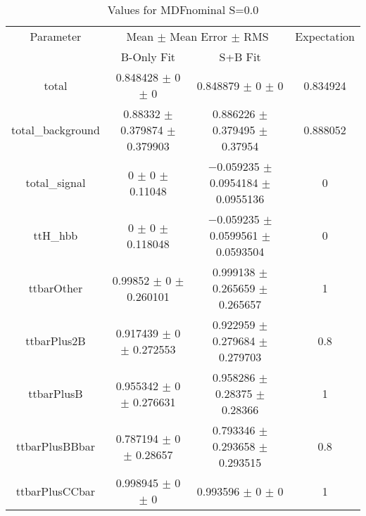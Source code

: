 \begin{table}
\centering
\caption{Values for MDFnominal S=0.0}
\begin{tabular}{cccc}
\toprule
Parameter & \multicolumn{2}{c}{Mean $\pm$ Mean Error $\pm$ RMS} & Expectation\\
 & B-Only Fit & S+B Fit & \\
\midrule
total & \num{0.848428} $\pm$ \num{0} $\pm$ \num{0} & \num{0.848879} $\pm$ \num{0} $\pm$ \num{0} & \num{0.834924}\\
total\_background & \num{0.88332} $\pm$ \num{0.379874} $\pm$ \num{0.379903} & \num{0.886226} $\pm$ \num{0.379495} $\pm$ \num{0.37954} & \num{0.888052}\\
total\_signal & \num{0} $\pm$ \num{0} $\pm$ \num{0.11048} & \num{-0.059235} $\pm$ \num{0.0954184} $\pm$ \num{0.0955136} & \num{0}\\
ttH\_hbb & \num{0} $\pm$ \num{0} $\pm$ \num{0.118048} & \num{-0.059235} $\pm$ \num{0.0599561} $\pm$ \num{0.0593504} & \num{0}\\
ttbarOther & \num{0.99852} $\pm$ \num{0} $\pm$ \num{0.260101} & \num{0.999138} $\pm$ \num{0.265659} $\pm$ \num{0.265657} & \num{1}\\
ttbarPlus2B & \num{0.917439} $\pm$ \num{0} $\pm$ \num{0.272553} & \num{0.922959} $\pm$ \num{0.279684} $\pm$ \num{0.279703} & \num{0.8}\\
ttbarPlusB & \num{0.955342} $\pm$ \num{0} $\pm$ \num{0.276631} & \num{0.958286} $\pm$ \num{0.28375} $\pm$ \num{0.28366} & \num{1}\\
ttbarPlusBBbar & \num{0.787194} $\pm$ \num{0} $\pm$ \num{0.28657} & \num{0.793346} $\pm$ \num{0.293658} $\pm$ \num{0.293515} & \num{0.8}\\
ttbarPlusCCbar & \num{0.998945} $\pm$ \num{0} $\pm$ \num{0} & \num{0.993596} $\pm$ \num{0} $\pm$ \num{0} & \num{1}\\
\bottomrule
\end{tabular}
\end{table}